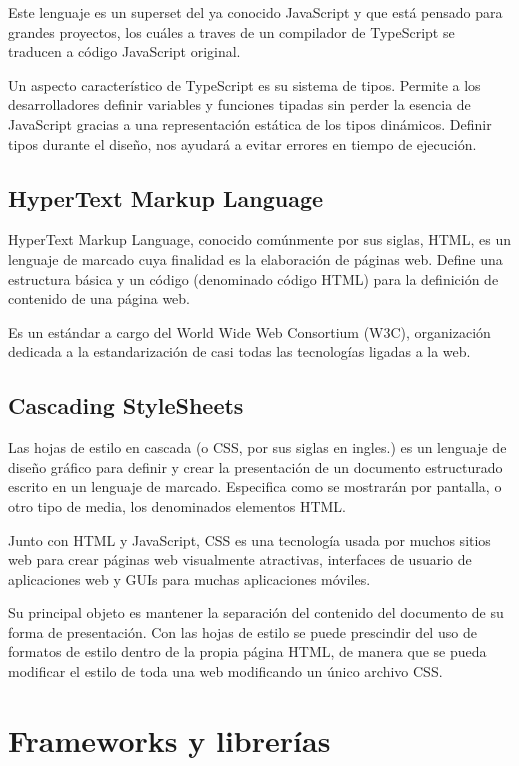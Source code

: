 Este lenguaje es un superset del ya conocido JavaScript y que está pensado para grandes proyectos, los cuáles a traves de un compilador de TypeScript se traducen a código JavaScript original.

Un aspecto característico de TypeScript es su sistema de tipos. Permite a los desarrolladores definir variables y funciones tipadas sin perder la esencia de JavaScript gracias a una representación estática de los tipos dinámicos. Definir tipos durante el diseño, nos ayudará a evitar errores en tiempo de ejecución.

\subsection{HyperText Markup Language}
HyperText Markup Language, conocido comúnmente por sus siglas, HTML, es un lenguaje de marcado cuya finalidad es la elaboración de páginas web. Define una estructura básica y un código (denominado código HTML) para la definición de contenido de una página web. 

Es un estándar a cargo del World Wide Web Consortium (W3C), organización dedicada a la estandarización de casi todas las tecnologías ligadas a la web.

\subsection{Cascading StyleSheets}
Las hojas de estilo en cascada (o CSS, por sus siglas en ingles.) es un lenguaje de diseño gráfico para definir y crear la presentación de un documento estructurado escrito en un lenguaje de marcado. Especifica como se mostrarán por pantalla, o otro tipo de media, los denominados elementos HTML.

Junto con HTML y JavaScript, CSS es una tecnología usada por muchos sitios web para crear páginas web visualmente atractivas, interfaces de usuario de aplicaciones web y GUIs para muchas aplicaciones móviles.

Su principal objeto es mantener la separación del contenido del documento de su forma de presentación. Con las hojas de estilo se puede prescindir del uso de formatos de estilo dentro de la propia página HTML, de manera que se pueda modificar el estilo de toda una web modificando un único archivo CSS.

\section{Frameworks y librerías}
